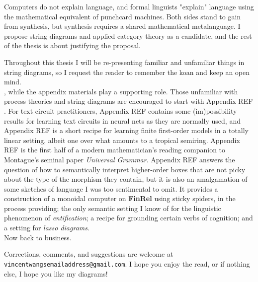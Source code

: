  Computers do not explain language, and formal linguists "explain" language using the mathematical equivalent of punchcard machines. Both sides stand to gain from synthesis, but synthesis requires a shared mathematical metalanguage. I propose string diagrams and applied category theory as a candidate, and the rest of the thesis is about justifying the proposal.


Throughout this thesis I will be re-presenting familiar and unfamiliar things in string diagrams, so I request the reader to remember the koan and keep an open mind.\\


, while the appendix materials play a supporting role. Those unfamiliar with process theories and string diagrams are encouraged to start with Appendix \bR REF \e. For text circuit practitioners, Appendix \bR REF \e contains some (im)possibility results for learning text circuits in neural nets as they are normally used, and Appendix \bR REF \e is a short recipe for learning finite first-order models in a totally linear setting, albeit one over what amounts to a tropical semiring. Appendix \bR REF \e is the first half of a modern mathematician's reading companion to Montague's seminal paper \emph{Universal Grammar}. Appendix \bR REF \e answers the question of how to semantically interpret higher-order boxes that are not picky about the type of the morphism they contain, but it is also an amalgamation of some sketches of language I was too sentimental to omit. It provides a construction of a monoidal computer on \textbf{FinRel} using sticky spiders, in the process providing; the only semantic setting I know of for the linguistic phenomenon of \emph{entification}; a recipe for grounding certain verbs of cognition; and a setting for \emph{lasso diagrams}.\\

Now back to business. 




Corrections, comments, and suggestions are welcome at \texttt{vincentwangsemailaddress@gmail.com}. I hope you enjoy the read, or if nothing else, I hope you like my diagrams!




